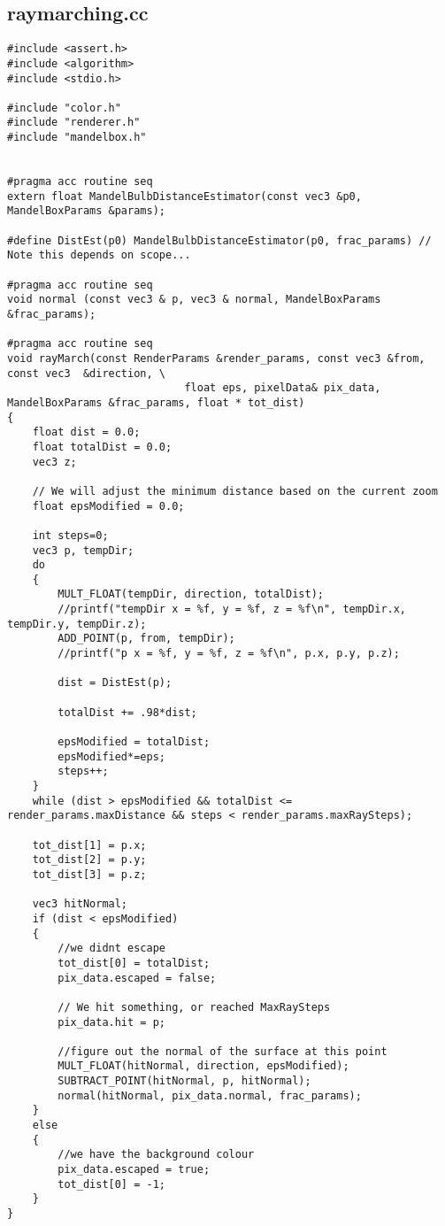 \documentclass[]{article}
\begin{document}
\subsection{raymarching.cc}
\begin{Verbatim}[fontsize= \footnotesize, tabsize=4]
#include <assert.h>
#include <algorithm>
#include <stdio.h>

#include "color.h"
#include "renderer.h"
#include "mandelbox.h"


#pragma acc routine seq
extern float MandelBulbDistanceEstimator(const vec3 &p0, MandelBoxParams &params);

#define DistEst(p0) MandelBulbDistanceEstimator(p0, frac_params) // Note this depends on scope...

#pragma acc routine seq
void normal (const vec3 & p, vec3 & normal, MandelBoxParams &frac_params);

#pragma acc routine seq
void rayMarch(const RenderParams &render_params, const vec3 &from, const vec3  &direction, \
							float eps, pixelData& pix_data, MandelBoxParams &frac_params, float * tot_dist)
{
	float dist = 0.0;
	float totalDist = 0.0;
	vec3 z;

	// We will adjust the minimum distance based on the current zoom
	float epsModified = 0.0;

	int steps=0;
	vec3 p, tempDir;
	do
	{
		MULT_FLOAT(tempDir, direction, totalDist);
		//printf("tempDir x = %f, y = %f, z = %f\n", tempDir.x, tempDir.y, tempDir.z);
		ADD_POINT(p, from, tempDir);
		//printf("p x = %f, y = %f, z = %f\n", p.x, p.y, p.z);

		dist = DistEst(p);

		totalDist += .98*dist;

		epsModified = totalDist;
		epsModified*=eps;
		steps++;
	}
	while (dist > epsModified && totalDist <= render_params.maxDistance && steps < render_params.maxRaySteps);

	tot_dist[1] = p.x;
	tot_dist[2] = p.y;
	tot_dist[3] = p.z;

	vec3 hitNormal;
	if (dist < epsModified)
	{
		//we didnt escape
		tot_dist[0] = totalDist;
		pix_data.escaped = false;

		// We hit something, or reached MaxRaySteps
		pix_data.hit = p;

		//figure out the normal of the surface at this point
		MULT_FLOAT(hitNormal, direction, epsModified);
		SUBTRACT_POINT(hitNormal, p, hitNormal);
		normal(hitNormal, pix_data.normal, frac_params);
	}
	else
	{
		//we have the background colour
		pix_data.escaped = true;
		tot_dist[0] = -1;
	}
}


\end{Verbatim}
\end{document}
